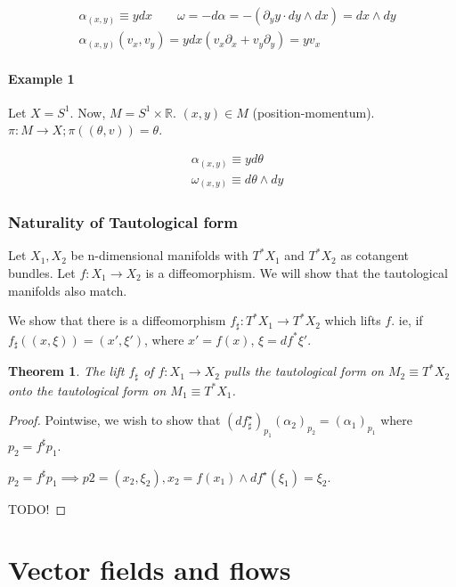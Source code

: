 \documentclass[11pt]{book}
\newcommand{\R}{\ensuremath{\mathbb R}}
\newcommand{\coT}{\ensuremath{T^*}}
\newtheorem{theorem}{Theorem}
\newtheorem{proof}{Proof}
\begin{document}
\begin{align*}
&\alpha_{(x, y)} \equiv y dx 
\qquad \omega = -d\alpha = - (\partial_y y \cdot dy \wedge dx) = dx \wedge dy \\
&\alpha_{(x, y)}(v_x, v_y) = y dx (v_x \partial_x + v_y \partial_y) = y v_x
\end{align*}


\subsubsection{Example 1}
Let $X = S^1$. Now, $M = S^1 \times \R$. $(x, y) \in M$ (position-momentum).
$\pi: M \rightarrow X; \pi((\theta, v)) = \theta$.

\begin{align*}
&\alpha_{(x, y)} \equiv y d\theta \\
&\omega_{(x, y)} \equiv d\theta \wedge dy
\end{align*}

\subsection{Naturality of Tautological form}
Let $X_1, X_2$ be n-dimensional manifolds with $T^* X_1$ and $T^* X_2$ as cotangent
bundles. Let $f: X_1 \rightarrow X_2$ is a diffeomorphism. We will show that
the tautological manifolds also match.

We show that there is a diffeomorphism $f_{\sharp}: T^*X_1 \rightarrow T^* X_2$
which lifts $f$. ie, if $f_{\sharp}((x, \xi)) = (x', \xi')$, where $x' = f(x)$,
$\xi = df^* \xi'$.

\begin{theorem} The lift $f_\sharp$ of $f: X_1 \rightarrow X_2$ pulls the
tautological form on $M_2 \equiv \coT X_2$ onto the tautological form on
$M_1 \equiv \coT X_1$.
\end{theorem}
\begin{proof}
Pointwise, we wish to show that $(df_\sharp^\star)_{p_1} (\alpha_2)_{p_2} = (\alpha_1)_{p_1}$
where $p_2 = f^\sharp p_1$.

$p_2 = f^\sharp p_1 \implies p2 = (x_2, \xi_2), x_2 = f(x_1) \land df^\star(\xi_1) = \xi_2$.

TODO!
\end{proof}

\chapter{Vector fields and flows}
\end{document}
